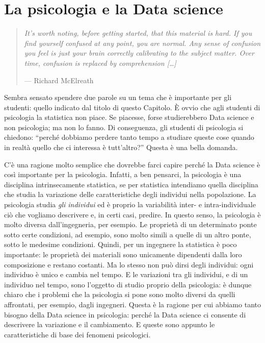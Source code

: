 \documentclass[
  10pt,
  italian,
  a4paper,
  extrafontsizes,onecolumn,openright
  ]{memoir}
\theoremstyle{definition}
\theoremstyle{definition}
\theoremstyle{definition}
\theoremstyle{definition}
\theoremstyle{remark}
\begin{document}
\hypertarget{la-psicologia-e-la-data-science}{%
\section{La psicologia e la Data science}\label{la-psicologia-e-la-data-science}}

\begin{quote}
\emph{It's worth noting, before getting started, that this material is hard. If you find yourself confused at any point, you are normal. Any sense of confusion you feel is just your brain correctly calibrating to the subject matter. Over time, confusion is replaced by comprehension {[}\ldots{]}}

\hfill --- Richard McElreath
\end{quote}

Sembra sensato spendere due parole su un tema che è importante per gli studenti: quello indicato dal titolo di questo Capitolo. È ovvio che agli studenti di psicologia la statistica non piace. Se piacesse, forse studierebbero Data science e non psicologia; ma non lo fanno. Di conseguenza, gli studenti di psicologia si chiedono: ``perché dobbiamo perdere tanto tempo a studiare queste cose quando in realtà quello che ci interessa è tutt'altro?'' Questa è una bella domanda.

C'è una ragione molto semplice che dovrebbe farci capire perché la Data science è così importante per la psicologia. Infatti, a ben pensarci, la psicologia è una disciplina intrinsecamente statistica, se per statistica intendiamo quella disciplina che studia la variazione delle caratteristiche degli individui nella popolazione. La psicologia studia \emph{gli individui} ed è proprio la variabilità inter- e intra-individuale ciò che vogliamo descrivere e, in certi casi, predire. In questo senso, la psicologia è molto diversa dall'ingegneria, per esempio. Le proprietà di un determinato ponte sotto certe condizioni, ad esempio, sono molto simili a quelle di un altro ponte, sotto le medesime condizioni. Quindi, per un ingegnere la statistica è poco importante: le proprietà dei materiali sono unicamente dipendenti dalla loro composizione e restano costanti. Ma lo stesso non può dirsi degli individui: ogni individuo è unico e cambia nel tempo. E le variazioni tra gli individui, e di un individuo nel tempo, sono l'oggetto di studio proprio della psicologia: è dunque chiaro che i problemi che la psicologia si pone sono molto diversi da quelli affrontati, per esempio, dagli ingegneri. Questa è la ragione per cui abbiamo tanto bisogno della Data science in psicologia: perché la Data science ci consente di descrivere la variazione e il cambiamento. E queste sono appunto le caratteristiche di base dei fenomeni psicologici.
\end{document}
